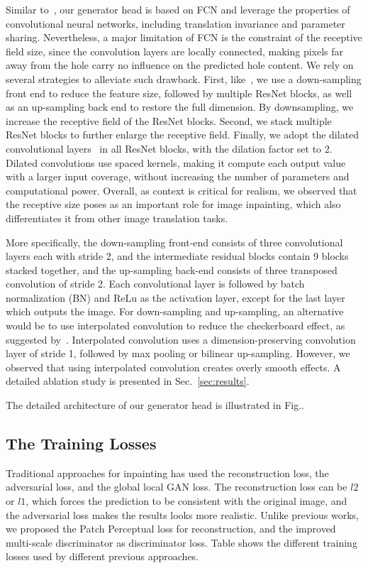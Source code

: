 \documentclass[runningheads]{llncs}
\begin{document}
Similar to~\cite{iizuka2017globally}, our generator head is based on FCN and leverage the properties of convolutional neural networks, including translation invariance and parameter sharing. Nevertheless, a major limitation of FCN is the constraint of the receptive field size, since the convolution layers are locally connected, making pixels far away from the hole carry no influence on the predicted hole content. We rely on several strategies to alleviate such drawback. First, like~\cite{iizuka2017globally}, we use a down-sampling front end to reduce the feature size, followed by multiple ResNet blocks, as well as an up-sampling back end to restore the full dimension. By downsampling, we increase the receptive field of the ResNet blocks. Second, we stack multiple ResNet blocks to further enlarge the receptive field. Finally, we adopt the dilated convolutional layers~\cite{yu2015multi} in all ResNet blocks, with the dilation factor set to 2. Dilated convolutions use spaced kernels, making it compute each output value with a larger input coverage, without increasing the number of parameters and computational power. Overall, as context is critical for realism, we observed that the receptive size poses as an important role for image inpainting, which also differentiates it from other image translation tasks. 

More specifically, the down-sampling front-end consists of three convolutional layers each with stride 2, and the intermediate residual blocks contain 9 blocks stacked together, and the up-sampling back-end consists of three transposed convolution of stride 2. Each convolutional layer is followed by batch normalization (BN) and ReLu as the activation layer, except for the last layer which outputs the image. For down-sampling and up-sampling, an alternative would be to use interpolated convolution to reduce the checkerboard effect, as suggested by~\cite{odena2016deconvolution}. Interpolated convolution uses a dimension-preserving convolution layer of stride 1, followed by max pooling or bilinear up-sampling. However, we observed that using interpolated convolution creates overly smooth effects. A detailed ablation study is presented in Sec.~\ref{sec:results}.

The detailed architecture of our generator head is illustrated in Fig..

\subsection{The Training Losses}
Traditional approaches for inpainting has used the reconstruction loss, the adversarial loss, and the global local GAN loss. The reconstruction loss can be $l2$ or $l1$, which forces the prediction to be consistent with the original image, and the adversarial loss makes the results looks more realistic. Unlike previous works, we proposed the Patch Perceptual loss for reconstruction, and the improved multi-scale discriminator as discriminator loss. Table shows the different training losses used by different previous approaches.
\end{document}
